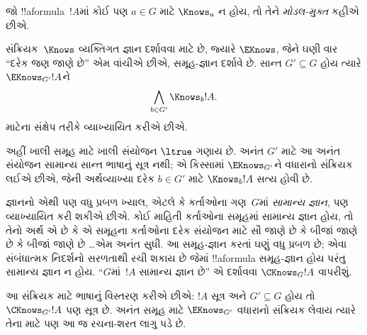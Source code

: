 \documentclass[../../../include/open-logic-section]{subfiles}
\begin{document}
જો !!a{formula}~$!A$માં કોઈ પણ $a\in G$ માટે $\Knows_a$ ન હોય, તો તેને
\emph{મોડલ-મુક્ત} કહીએ છીએ.

\begin{defn}
  સંક્રિયક~$\Knows$ વ્યક્તિગત જ્ઞાન દર્શાવવા માટે છે, જ્યારે
  $\EKnows$, જેને ઘણી વાર ``દરેક જણ જાણે છે'' એમ વાંચીએ છીએ,
  સમૂહ-જ્ઞાન દર્શાવે છે. સાન્ત $G' \subseteq G$ હોય ત્યારે
  $\EKnows_{G'} !A$ને \[\bigwedge_{b \in G'} \Knows_b !A.\]
  માટેના સંક્ષેપ તરીકે વ્યાખ્યાયિત કરીએ છીએ.
\end{defn}

અહીં ખાલી સમૂહ માટે ખાલી સંયોજન $\ltrue$ ગણાય છે.
અનંત $G'$ માટે આ અનંત સંયોજન સામાન્ય સાન્ત ભાષાનું સૂત્ર
નથી; એ કિસ્સામાં $\EKnows_{G'}$ને વધારાનો સંક્રિયક લઈએ છીએ,
જેની અર્થવ્યાખ્યા દરેક $b\in G'$ માટે $\Knows_b !A$ સત્ય હોવી છે.

જ્ઞાનનો એથી પણ વધુ પ્રબળ ખ્યાલ, એટલે કે કર્તાઓના ગણ~$G$માં
\emph{સામાન્ય જ્ઞાન}, પણ વ્યાખ્યાયિત કરી શકીએ છીએ. કોઈ માહિતી
કર્તાઓના સમૂહમાં સામાન્ય જ્ઞાન હોય, તો તેનો અર્થ એ છે કે એ સમૂહના
કર્તાઓના દરેક સંયોજન માટે સૌ જાણે છે કે બીજાં જાણે છે કે બીજાં
જાણે છે \dots એમ અનંત સુધી. આ સમૂહ-જ્ઞાન કરતાં ઘણું વધુ પ્રબળ
છે; એવા સંબંધાત્મક નિદર્શનો સરળતાથી રચી શકાય છે જેમાં
!!a{formula} સમૂહ-જ્ઞાન હોય પરંતુ સામાન્ય જ્ઞાન ન હોય.
``$G$માં~$!A$ સામાન્ય જ્ઞાન છે'' એ દર્શાવવા
$\CKnows_G !A$ વાપરીશું.

આ સંક્રિયક માટે ભાષાનું વિસ્તરણ કરીએ છીએ: $!A$ સૂત્ર અને
$G'\subseteq G$ હોય તો $\CKnows_{G'}!A$ પણ સૂત્ર છે.
અનંત સમૂહ માટે $\EKnows_{G'}$ વધારાનો સંક્રિયક લેવાય ત્યારે
તેના માટે પણ આ જ રચના-શરત લાગુ પડે છે.

\end{document}
